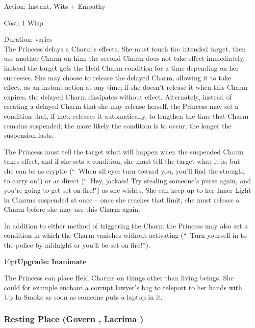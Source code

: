 \noindent Action: Instant, Wits + Empathy

\noindent Cost: 1 Wisp

\noindent Duration: varies \\

\noindent The Princess delays a Charm's effects. She must touch the intended target, then use another Charm on him; the second Charm does not take effect immediately, instead the target gets the Held Charm condition for a time depending on her successes. She may choose to release the delayed Charm, allowing it to take effect, as an instant action at any time; if she doesn't release it when this Charm expires, the delayed Charm dissipates without effect. Alternately, instead of creating a delayed Charm that she may release herself, the Princess may set a condition that, if met, releases it automatically, to lengthen the time that Charm remains suspended; the more likely the condition is to occur, the longer the suspension lasts.

The Princess must tell the target what will happen when the suspended Charm takes effect, and if she sets a condition, she must tell the target what it is; but she can be as cryptic (\textquotedblleft\, When all eyes turn toward you, you'll find the strength to carry on") or as direct (\textquotedblleft\, Hey, jackass! Try stealing someone's purse again, and you're going to get set on fire!") as she wishes. She can keep up to her Inner Light in Charms suspended at once -- once she reaches that limit, she must release a Charm before she may use this Charm again.

In addition to either method of triggering the Charm the Princess may also set a condition in which the Charm vanishes without activating (\textquotedblleft\, Turn yourself in to the police by midnight or you'll be set on fire!\textquotedblright). 

\begin{myindentpar}{10pt}\textbf{Upgrade: Inanimate}

The Princess can place Held Charms on things other than living beings. She could for example enchant a corrupt lawyer's bag to teleport to her hands with Up In Smoke as soon as someone puts a laptop in it.\end{myindentpar}

\subsubsection*{Resting Place (Govern \textbullet\textbullet\textbullet, Lacrima \textbullet\textbullet\textbullet)}

